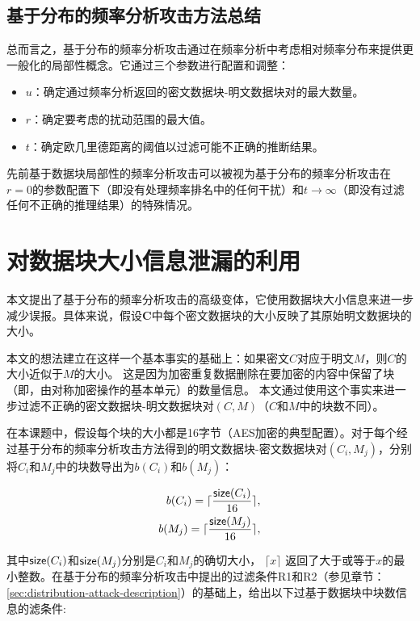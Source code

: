 \subsection{基于分布的频率分析攻击方法总结} 

总而言之，基于分布的频率分析攻击通过在频率分析中考虑相对频率分布来提供更一般化的局部性概念。它通过三个参数进行配置和调整：

\begin{itemize}
    \item $u$：确定通过频率分析返回的密文数据块-明文数据块对的最大数量。
    \item $r$：确定要考虑的扰动范围的最大值。
    \item $t$：确定欧几里德距离的阈值以过滤可能不正确的推断结果。 
\end{itemize}


先前基于数据块局部性的频率分析攻击可以被视为基于分布的频率分析攻击在$r=0$的参数配置下（即没有处理频率排名中的任何干扰）和$t \rightarrow \infty$（即没有过滤任何不正确的推理结果）的特殊情况。

\section{对数据块大小信息泄漏的利用}

本文提出了基于分布的频率分析攻击的高级变体，它使用数据块大小信息来进一步减少误报。具体来说，假设$\mathbf{C}$中每个密文数据块的大小反映了其原始明文数据块的大小。 

本文的想法建立在这样一个基本事实的基础上：如果密文$C$对应于明文$M$，则$C$的大小近似于$M$的大小。 这是因为加密重复数据删除在要加密的内容中保留了块（即，由对称加密操作的基本单元）的数量信息。 本文通过使用这个事实来进一步过滤不正确的密文数据块-明文数据块对$(C,M)$（$C$和$M$中的块数不同）。

在本课题中，假设每个块的大小都是16字节（AES加密的典型配置）。对于每个经过基于分布的频率分析攻击方法得到的明文数据块-密文数据块对$(C_i, M_j)$，分别将$C_i$和$M_j$中的块数导出为$b({C_i})$和$b({M_j})$：

\begin{eqnarray*}
b({C_i}) = \lceil \frac{{\sf size}(C_i)}{16} \rceil, \nonumber \\
b({M_j}) = \lceil \frac{{\sf size}(M_j)}{16} \rceil, \nonumber 
\end{eqnarray*}

其中${\sf size}(C_i)$和${\sf size}(M_j)$分别是$C_i$和$M_j$的确切大小， $\lceil x \rceil$ 返回了大于或等于$x$的最小整数。在基于分布的频率分析攻击中提出的过滤条件R1和R2（参见章节：\ref{sec:distribution-attack-description}）的基础上，给出以下过基于数据块中块数信息的滤条件:  
 
